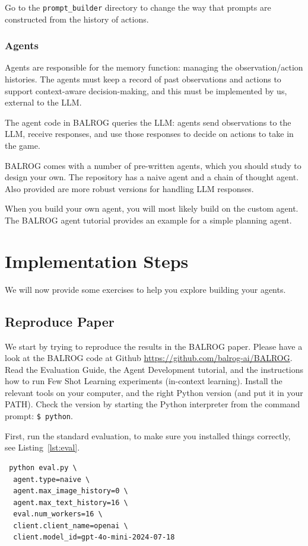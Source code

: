 Go to the \verb|prompt_builder| directory to change the way that prompts are constructed from the history of actions. 

\subsubsection{Agents}
Agents are responsible for the memory function: managing 
the observation/action histories. 
The agents must keep a record of past observations and actions to support context-aware decision-making, and this must be implemented by us, external to the LLM.

The agent code in BALROG queries  the LLM: agents send observations to the LLM, receive responses, and use those responses to decide on actions to take in the game.

BALROG comes with a number of pre-written agents, which you should study to design your own. The repository has a naive agent and a chain of thought agent. Also provided are more robust versions for handling LLM responses. 

When you build your own agent, you will most likely build on the custom agent. 
The BALROG agent tutorial provides an example for a simple planning agent.


\section{Implementation Steps}
We will now provide some exercises to help you explore building your agents.
\subsection{Reproduce Paper}

We start by trying to reproduce the results in the BALROG paper.
Please have a look at the BALROG code at Github \url{https://github.com/balrog-ai/BALROG}. Read the Evaluation Guide, the Agent Development tutorial, and the instructions how to run Few Shot Learning experiments (in-context learning).
Install the relevant tools on your computer, and the right Python version (and put it in your PATH). Check the version by starting the Python interpreter from the command prompt: \verb|$ python|.

First, run the standard evaluation, to make sure you installed things correctly, see Listing~\ref{lst:eval}. 
\begin{listing}
    \begin{verbatim}
 python eval.py \
  agent.type=naive \
  agent.max_image_history=0 \
  agent.max_text_history=16 \
  eval.num_workers=16 \
  client.client_name=openai \
  client.model_id=gpt-4o-mini-2024-07-18       
    \end{verbatim}
    \caption{Running the standard evaluation}\label{lst:eval}
\end{listing}




